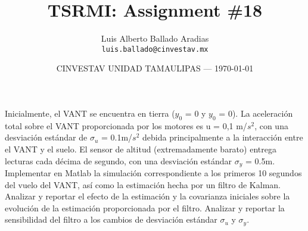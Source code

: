 \documentclass{article}
\title{TSRMI: Assignment \#18} %
\author{Luis Alberto Ballado Aradias\\ \texttt{luis.ballado@cinvestav.mx}} %
\date{CINVESTAV UNIDAD TAMAULIPAS --- \today} %
\begin{document}
\maketitle %


Inicialmente, el VANT se encuentra en tierra ($y_{0}$ = 0 y $y_{0}$ = 0). La aceleraci\'{o}n total sobre el VANT proporcionada por los motores es u = 0,1 m/$s^{2}$, con una desviación estándar de $\sigma_{u}$ = 0.1m/$s^{2}$ debida principalmente a la interacci\'{o}n entre el VANT y el suelo. El sensor de altitud (extremadamente barato) entrega lecturas cada d\'{e}cima de segundo, con una desviaci\'{o}n est\'{a}ndar $\sigma_{y}$ = 0.5m.\\

Implementar en Matlab la simulaci\'{o}n correspondiente a los primeros 10 segundos del vuelo del VANT, así como la estimación hecha por un filtro de Kalman. Analizar y reportar el efecto de la estimación y la covarianza iniciales sobre la evolución de la estimación proporcionada por el filtro. Analizar y reportar la sensibilidad del filtro a los cambios de desviación estándar $\sigma_{u}$ y $\sigma_{y}$.
\end{document}
